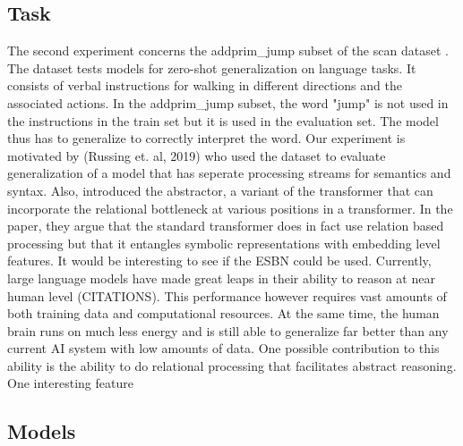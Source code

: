 \subsection{Task}
The second experiment concerns the addprim\_jump subset of the scan dataset \textcite{lake_generalization_2018}. The dataset tests models for zero-shot generalization on language tasks. It consists of verbal instructions for walking in different directions and the associated actions. In the addprim\_jump subset, the word "jump" is not used in the instructions in the train set but it is used in the evaluation set. The model thus has to generalize to correctly interpret the word. \newline
Our experiment is motivated by (Russing et. al, 2019) who used the dataset to evaluate generalization of a model that has seperate processing streams for semantics and syntax. Also, \textcite{altabaa_abstractors_2023} introduced the abstractor, a variant of the transformer that can incorporate the relational bottleneck at various positions in a transformer. In the paper, they argue that the standard transformer does in fact use relation based processing but that it entangles symbolic representations with embedding level features.
It would be interesting to see if the ESBN could be used. Currently, large language models have made great leaps in their ability to reason at near human level (CITATIONS). This performance however requires vast amounts of both training data and computational resources. At the same time, the human brain runs on much less energy and is still able to generalize far better than any current AI system with low amounts of data. One possible contribution to this ability is the ability to do relational processing that facilitates abstract reasoning. \newline
One interesting feature

\subsection{Models}

